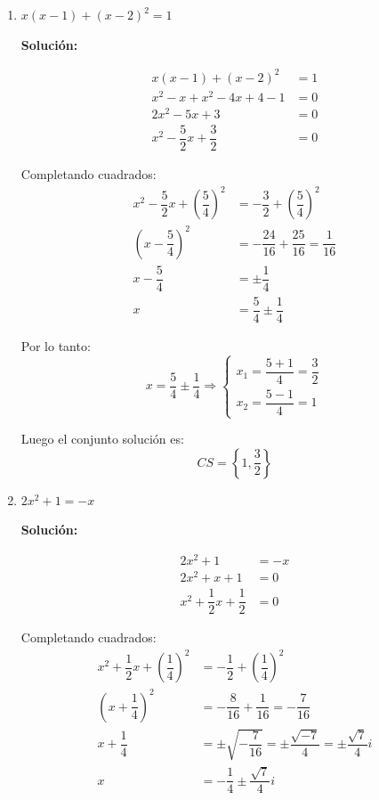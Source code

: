\documentclass[12pt]{article}
\newcommand{\solucion}{%
    \vspace{0.8em}%
    \textbf{Solución:}%
}
\begin{document}
\begin{enumerate}[label=\alph*.-]
\item $x(x - 1) + (x - 2)^2 = 1$

\solucion
\begin{align*}
x(x-1) + (x-2)^2 &= 1 \\[0.3em]
x^2 - x + x^2 - 4x + 4 - 1 &= 0 \\[0.3em]
2x^2 - 5x + 3 &= 0 \\[0.3em]
x^2 - \dfrac{5}{2}x + \dfrac{3}{2} &= 0
\end{align*}

Completando cuadrados:
\begin{align*}
x^2 - \dfrac{5}{2}x + \left(\dfrac{5}{4}\right)^2 &= -\dfrac{3}{2} + \left(\dfrac{5}{4}\right)^2 \\[0.3em]
\left(x - \dfrac{5}{4}\right)^2 &= -\dfrac{24}{16} + \dfrac{25}{16} = \dfrac{1}{16} \\[0.3em]
x - \dfrac{5}{4} &= \pm \dfrac{1}{4} \\[0.3em]
x &= \dfrac{5}{4} \pm \dfrac{1}{4}
\end{align*}

Por lo tanto:
\[
x = \dfrac{5}{4} \pm \dfrac{1}{4} \Rightarrow \begin{cases} x_1 = \dfrac{5+1}{4} = \dfrac{3}{2} \\[0.5em] x_2 = \dfrac{5-1}{4} = 1 \end{cases}
\]

Luego el conjunto solución es:
\[
\boxed{CS = \left\{1, \dfrac{3}{2}\right\}}
\]

\newpage
\item $2x^2 + 1 = -x$

\solucion
\begin{align*}
2x^2 + 1 &= -x \\[0.3em]
2x^2 + x + 1 &= 0 \\[0.3em]
x^2 + \dfrac{1}{2}x + \dfrac{1}{2} &= 0
\end{align*}

Completando cuadrados:
\begin{align*}
x^2 + \dfrac{1}{2}x + \left(\dfrac{1}{4}\right)^2 &= -\dfrac{1}{2} + \left(\dfrac{1}{4}\right)^2 \\[0.3em]
\left(x + \dfrac{1}{4}\right)^2 &= -\dfrac{8}{16} + \dfrac{1}{16} = -\dfrac{7}{16} \\[0.3em]
x + \dfrac{1}{4} &= \pm \sqrt{-\dfrac{7}{16}} = \pm \dfrac{\sqrt{-7}}{4} = \pm \dfrac{\sqrt{7}}{4}i \\[0.3em]
x &= -\dfrac{1}{4} \pm \dfrac{\sqrt{7}}{4}i
\end{align*}


\end{enumerate}
\end{document}

